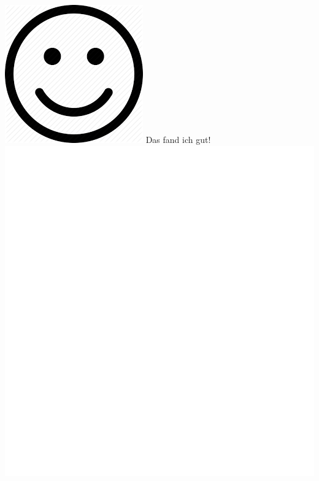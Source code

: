 \documentclass[oneside,openany,headings=optiontotoc,11pt,numbers=noenddot]{scrreprt}
\begin{document}
				
	\noindent
	\sffamily
	\begin{framed}
		\noindent
		\includegraphics[scale=0.1]{hsmi.png} \tiny{\color{codegray}Das fand ich gut!}\\
		\includegraphics[scale=0.15]{empty.jpg}
	\end{framed}
\end{document}
